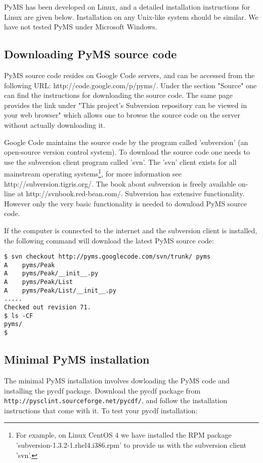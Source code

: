 PyMS has been developed on Linux, and a detailed installation instructions
for Linux are given below. Installation on any Unix-like system should be
similar. We have not tested PyMS under Microsoft Windows.

\subsection{Downloading PyMS source code}

PyMS source code resides on Google Code servers, and can be accessed
from the following URL: http://code.google.com/p/pyms/. Under the
section "Source" one can find the instructions for downloading the
source code. The same page provides the link under "This project's
Subversion repository can be viewed in your web browser" which allows
one to browse the source code on the server without actually downloading
it.

Google Code maintains the source code by the program called 'subversion'
(an open-source version control system).  To download the source code
one needs to use the subversion client program called 'svn'. The 'svn'
client exists for all mainstream operating systems\footnote{For example,
on Linux CentOS 4 we have installed the RPM package
'subversion-1.3.2-1.rhel4.i386.rpm' to provide us with the subversion
client 'svn'.}, for more information see http://subversion.tigris.org/.
The book about subversion is freely available on-line at
http://svnbook.red-bean.com/. Subversion has extensive functionality.
However only the very basic functionality is needed to download PyMS
source code.

If the computer is connected to the internet and the subversion client
is installed, the following command will download the latest PyMS source
code:

\begin{verbatim}
$ svn checkout http://pyms.googlecode.com/svn/trunk/ pyms
A    pyms/Peak
A    pyms/Peak/__init__.py
A    pyms/Peak/List
A    pyms/Peak/List/__init__.py
.....
Checked out revision 71.
$ ls -CF
pyms/
$
\end{verbatim}

\subsection{Minimal PyMS installation}

The minimal PyMS installation involves dowloading the PyMS code and
installing the pycdf package. Download the pycdf package from
{\tt http://pysclint.sourceforge.net/pycdf/}, and follow the
installation instructions that come with it. To test your pycdf
installation:

